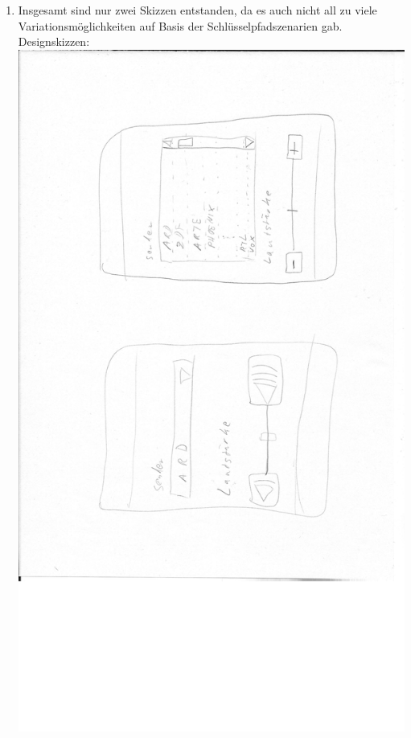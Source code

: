 \documentclass[a4paper,10pt]{scrartcl}
\begin{document}
\begin{enumerate}
		\newpage
		\item Insgesamt sind nur zwei Skizzen entstanden, da es auch nicht all zu viele Variationsmöglichkeiten auf Basis der Schlüsselpfadszenarien gab.
		Designskizzen: \\
		\includegraphics[scale=0.15]{sketch1}
		

\end{enumerate}
\end{document}
